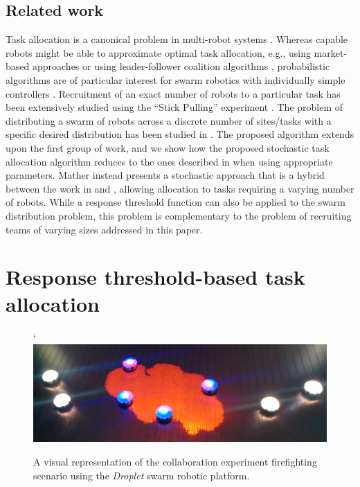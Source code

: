 \documentclass{svmult}  %
\begin{document}
\subsection{Related work}
Task allocation is a canonical problem in multi-robot systems \cite{Gerkey2004}. Whereas capable robots might be able to approximate optimal task allocation, e.g., using market-based approaches \cite{Amstutz2008,Vig2007} or using  leader-follower coalition algorithms \cite{Chen2011}, probabilistic algorithms are of particular interest for swarm robotics with individually simple controllers \cite{Dantu2012}. Recruitment of an exact number of robots to a particular task has been extensively studied using the ``Stick Pulling'' experiment \cite{Lerman2001,Martinoli2004}. The problem of distributing a swarm of robots across a discrete number of sites/tasks with a specific desired distribution has been studied in \cite{Berman2009,Correll2008}. The proposed algorithm extends upon the first group of work, and we show how the proposed stochastic task allocation algorithm reduces to the ones described in \cite{Lerman2001,Martinoli2004} when using appropriate parameters.  Mather \cite{Mather2010} instead presents a stochastic approach that is a hybrid between the work in \cite{Berman2009} and \cite{Martinoli2004}, allowing allocation to tasks requiring a varying number of robots.
While a response threshold function can also be applied to the swarm distribution problem, this problem is complementary to the problem of recruiting teams of varying sizes addressed in this paper. 



\section{Response threshold-based task allocation}\label{sec:expsetup}
\begin{figure}[!htb]`
\centering\includegraphics[width=.98\textwidth]{figures/setup.png}
\centering\caption{A visual representation of the collaboration experiment firefighting scenario using the \emph{Droplet} swarm robotic platform.}\label{fig:setup}
\end{figure}
\end{document}
